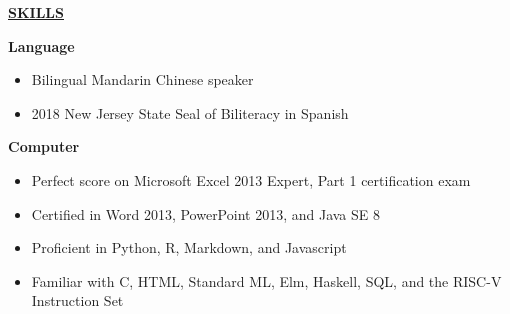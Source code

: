 \documentclass[
]{article}
\begin{document}
\textbf{\underline{SKILLS}}

\textbf{Language}

\begin{itemize}
\item
  Bilingual Mandarin Chinese speaker 
\item
  2018 New Jersey State Seal of Biliteracy in Spanish
\end{itemize}

\textbf{Computer}

\begin{itemize}
\item
  Perfect score on Microsoft Excel 2013 Expert, Part 1 certification
  exam
\item
  Certified in Word 2013, PowerPoint 2013, and Java SE 8
\end{itemize}

\begin{itemize}
\item
  Proficient in Python, R, Markdown, and Javascript
\item
  Familiar with C, HTML, Standard ML, Elm, Haskell, SQL, and the RISC-V
  Instruction Set
\end{itemize}
\end{document}
